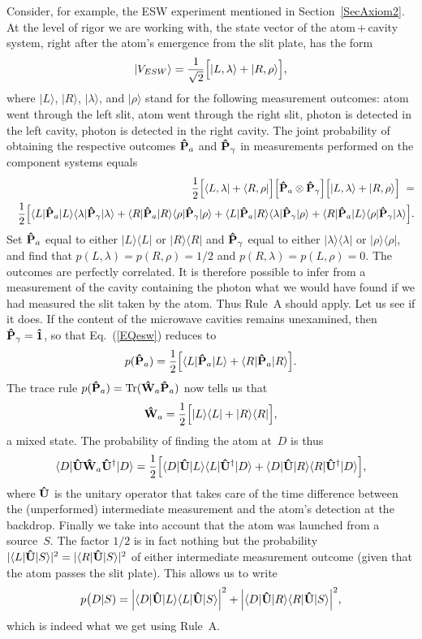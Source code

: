 \documentclass[12pt]{article}
\newcommand{\bra}[1]{\langle#1\vert}
\newcommand{\ket}[1]{\vert#1\rangle}
\newcommand{\ketbra}[2]{\vert#1\rangle\langle#2\vert}
\newcommand{\sandwich}[3]{\langle#1\vert#2\vert#3\rangle}
\newcommand{\Tr}{\hbox{Tr}}
\newcommand{\be}{\begin{equation}}
\newcommand{\ee}{\end{equation}}
\newcommand{\bea}{\begin{eqnarray}}
\newcommand{\eea}{\end{eqnarray}}
\newcommand{\hI}{{\bf\hat 1}}
\newcommand{\hP}{{\bf\hat P}}
\newcommand{\hU}{{\bf\hat U}}
\newcommand{\hW}{{\bf\hat W}}
\begin{document}
Consider, for example, the ESW experiment mentioned in Section~\ref{SecAxiom2}. At the level of rigor we are working with, the state vector of the atom\,+\,cavity system, right after the atom's emergence from the slit plate, has the form
\be
\ket{V_{ESW}}=\frac1{\sqrt2}\Bigl[\ket{L,\lambda}+\ket{R,\rho}\Bigr],
\ee
where $\ket L$, $\ket R$, $\ket\lambda$, and $\ket\rho$ stand for the following measurement outcomes: atom went through the left slit, atom went through the right slit, photon is detected in the left cavity, photon is detected in the right cavity. The joint probability of obtaining the respective outcomes $\hP_a$ and $\hP_\gamma$ in measurements performed on the component systems equals
\bea
\label{EQesw}
&&\frac12\Bigl[\bra{L,\lambda}+\bra{R,\rho}\Bigr]\Bigl[\hP_a\otimes\hP_\gamma\Bigr]
\Bigl[\ket{L,\lambda}+\ket{R,\rho}\Bigr]\;=\\
&&\frac12\Bigl[\sandwich L{\hP_a}L\sandwich\lambda{\hP_\gamma}\lambda+
\sandwich R{\hP_a}R\sandwich\rho{\hP_\gamma}\rho+
\sandwich L{\hP_a}R\sandwich\lambda{\hP_\gamma}\rho+
\sandwich R{\hP_a}L\sandwich\rho{\hP_\gamma}\lambda\Bigr].\nonumber
\eea
Set $\hP_a$ equal to either $\ketbra LL$ or $\ketbra RR$ and $\hP_\gamma$ equal to either $\ketbra\lambda\lambda$ or $\ketbra\rho\rho$, and find that $p(L,\lambda)=p(R,\rho)=1/2$ and $p(R,\lambda)=p(L,\rho)=0$. The outcomes are perfectly correlated. It is therefore possible to infer from a measurement of the cavity containing the photon what we would have found if we had measured the slit taken by the atom. Thus Rule~A should apply. Let us see if it does. If the content of the microwave cavities remains unexamined, then $\hP_\gamma=\hI$, so that Eq.~(\ref{EQesw}) reduces to
\be
p(\hP_a)=\frac12\Bigl[\sandwich L{\hP_a}L+\sandwich R{\hP_a}R\Bigr].
\ee
The trace rule $p(\hP_a)=\Tr(\hW_a\hP_a)$ now tells us that
\be
\hW_a=\frac12\Bigl[\ketbra LL +\ketbra RR\Bigr],
\ee
a mixed state. The probability of finding the atom at~$D$ is thus
\be
\sandwich D{\hU\hW_a\hU^\dagger}D=\frac12\Bigl[\sandwich D\hU L\sandwich L{\hU^\dagger}D +\sandwich D\hU R\sandwich R{\hU^\dagger}D\Bigr],
\ee
where $\hU$ is the unitary operator that takes care of the time difference  between the (unperformed) intermediate measurement and the atom's detection at the backdrop. Finally we take into account that the atom was launched from a source~$S$. The factor $1/2$ is in fact nothing but the probability $|\sandwich L\hU S|^2=|\sandwich R\hU S|^2$ of either intermediate measurement outcome (given that the atom passes the slit plate). This allows us to write
\be
p\bigl(D|S)=\Bigl|\sandwich D\hU L\sandwich L\hU S\Bigr|^2+\Bigl|\sandwich D\hU R\sandwich R\hU S\Bigr|^2,
\ee
which is indeed what we get using Rule~A.
\end{document}

